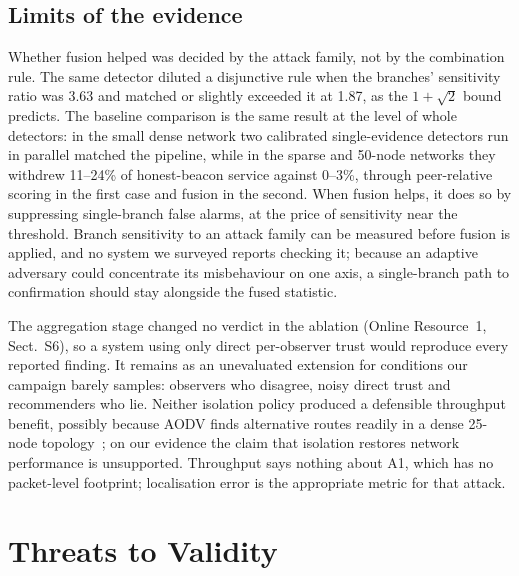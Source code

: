 \subsection{Limits of the evidence}

Whether fusion helped was decided by the attack family, not by the
combination rule. The same detector diluted a disjunctive rule when the
branches' sensitivity ratio was 3.63 and matched or slightly exceeded it at
1.87, as the $1+\sqrt2$ bound predicts. The baseline comparison is the same
result at the level of whole detectors: in the small dense network two
calibrated single-evidence detectors run in parallel matched the pipeline,
while in the sparse and 50-node networks they withdrew 11--24\% of
honest-beacon service against 0--3\%, through peer-relative scoring in the
first case and fusion in the second. When fusion helps, it does so by
suppressing single-branch false alarms, at the price of sensitivity near the
threshold. Branch sensitivity to an attack family can be measured before
fusion is applied, and no system we surveyed reports checking it; because an
adaptive adversary could concentrate its misbehaviour on one axis, a
single-branch path to confirmation should stay alongside the fused statistic.

The aggregation stage changed no verdict in the ablation (Online Resource~1,
Sect.~S6), so a system using only direct per-observer trust would reproduce
every reported finding. It remains as an unevaluated extension for conditions
our campaign barely samples: observers who disagree, noisy direct trust and
recommenders who lie. Neither isolation policy produced a defensible
throughput benefit, possibly because AODV finds alternative routes readily in
a dense 25-node topology~\cite{sirajuddin2021tbsmr,kavitha2019india,buksh2024trust};
on our evidence the claim that isolation restores network performance is
unsupported. Throughput says nothing about A1, which has no packet-level
footprint; localisation error is the appropriate metric for that attack.

\section{Threats to Validity}
\label{sec:threats}


